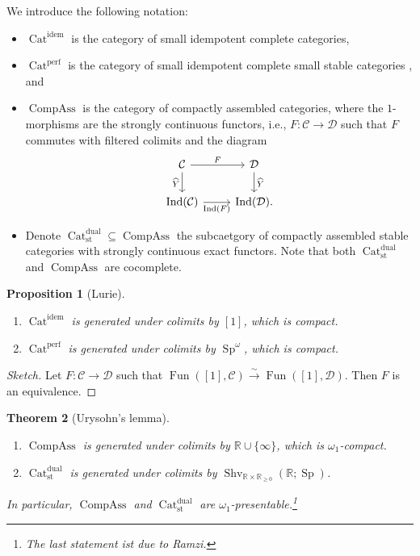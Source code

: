 \documentclass[draft]{amsart}
\newcommand{\RR}{\mathbb{R}}
\newcommand{\wh}[1]{\widehat{#1}}
\newcommand{\cat}[1]{\mathcal{#1}}
\newcommand{\isoto}{\mathbin{\xrightarrow{\sim}}}
\DeclareMathOperator{\Ind}{Ind}
\DeclareMathOperator{\Shv}{Shv}
\DeclareMathOperator{\Cat}{Cat}
\DeclareMathOperator{\CompAss}{CompAss}
\DeclareMathOperator{\Sp}{Sp}
\DeclareMathOperator{\Fun}{Fun}
\newtheorem{thm}{Theorem}[section]
\newtheorem{prop}[thm]{Proposition}
\theoremstyle{definition}
\begin{document}
We introduce the following notation:
\begin{itemize}
\item $\Cat^{\mathrm{idem}}$ is the category of small idempotent complete categories,

\item $\Cat^{\mathrm{perf}}$ is the category of small idempotent complete small stable categories , and 

\item $\CompAss$ is the category of compactly assembled categories, where the $1$-morphisms are the strongly continuous functors, i.e., $F\colon \cat C\to \cat D$ such that $F$ commutes with filtered colimits and the diagram
\[
\begin{tikzcd}
\cat C \ar[d,"\wh{Y}"'] \ar[r,"F"] & \cat D \ar[d,"\wh{Y}"] \\
\Ind(\cat C)\ar[r,"\Ind(F)"'] & \Ind(\cat D).
\end{tikzcd}
\]

\item Denote $\Cat^{\mathrm{dual}}_{\mathrm{st}} \subseteq \CompAss$ the subcaetgory of compactly assembled stable categories with strongly continuous exact functors.
Note that both $\Cat^{\mathrm{dual}}_{\mathrm{st}}$ and $\CompAss$ are cocomplete.
\end{itemize}

\begin{prop}[Lurie]
\begin{enumerate}[(1)]
\item $\Cat^{\mathrm{idem}}$ is generated under colimits by $[1]$, which is compact.

\item $\Cat^{\mathrm{perf}}$ is generated under colimits by $\Sp^{\omega}$, which is compact.
\end{enumerate}
\end{prop}
\begin{proof}[Sketch]
Let $F\colon \cat C\to \cat D$ such that $\Fun([1],\cat C) \isoto \Fun([1], \cat D)$. Then $F$ is an equivalence.
\end{proof}

\begin{thm}[Urysohn's lemma]\label{Efimov:Urysohn}
\begin{enumerate}[(1)]
\item $\CompAss$ is generated under colimits by $\RR\cup \{\infty\}$, which is $\omega_1$-compact.

\item $\Cat^{\mathrm{dual}}_{\mathrm{st}}$ is generated under colimits by $\Shv_{\RR\times \RR_{\ge0}}(\RR;\Sp)$.
\end{enumerate}
In particular, $\CompAss$ and $\Cat^{\mathrm{dual}}_{\mathrm{st}}$ are $\omega_1$-presentable.\footnote{The last statement ist due to Ramzi.}
\end{thm}
\end{document}

